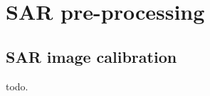 \section{SAR pre-processing}\label{sec:sarpreproc}

\subsection{SAR image calibration}\label{ssec:sarcal}

todo.
